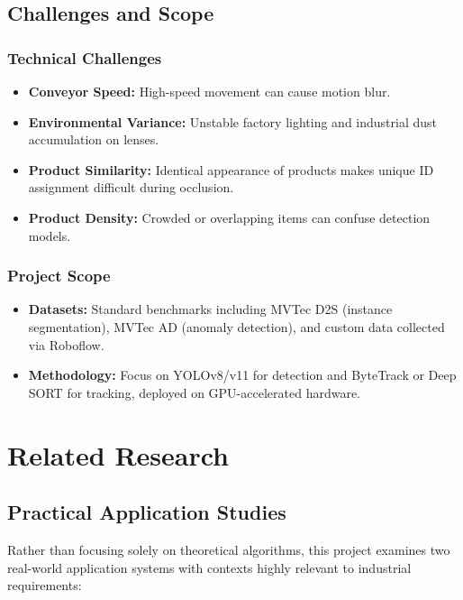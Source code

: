\documentclass[12pt,a4paper]{report}
\begin{document}
\section{Challenges and Scope}
\subsection{Technical Challenges}
\begin{itemize}
    \item \textbf{Conveyor Speed:} High-speed movement can cause motion blur.
    \item \textbf{Environmental Variance:} Unstable factory lighting and industrial dust accumulation on lenses.
    \item \textbf{Product Similarity:} Identical appearance of products makes unique ID assignment difficult during occlusion.
    \item \textbf{Product Density:} Crowded or overlapping items can confuse detection models.
\end{itemize}

\subsection{Project Scope}
\begin{itemize}
    \item \textbf{Datasets:} Standard benchmarks including MVTec D2S (instance segmentation), MVTec AD (anomaly detection), and custom data collected via Roboflow.
    \item \textbf{Methodology:} Focus on YOLOv8/v11 for detection and ByteTrack or Deep SORT for tracking, deployed on GPU-accelerated hardware.
\end{itemize}

\chapter{Related Research}

\section{Practical Application Studies}
Rather than focusing solely on theoretical algorithms, this project examines two real-world application systems with contexts highly relevant to industrial requirements:
\end{document}
